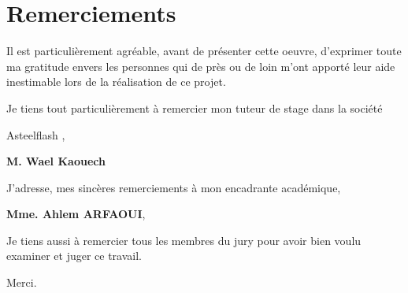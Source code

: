 \chapter*{\huge Remerciements}

\begin{center}
\it \Large

Il est particulièrement agréable, avant de présenter cette oeuvre, d’exprimer toute ma gratitude envers les personnes qui de près ou de loin m’ont apporté leur aide inestimable lors de la réalisation de ce projet.

Je tiens tout particulièrement à remercier mon tuteur de stage dans la société
\begin{center}
   Asteelflash , 
\end{center}

\begin{center}
\textbf{M. Wael Kaouech}
\end{center}


J’adresse, mes sincères remerciements à mon encadrante académique,



\begin{center}
\textbf{Mme. Ahlem ARFAOUI},
\end{center}



Je tiens aussi à remercier tous les membres du jury pour avoir bien voulu examiner et juger ce travail.


Merci.
    
    
    
    
    
    
\end{center}